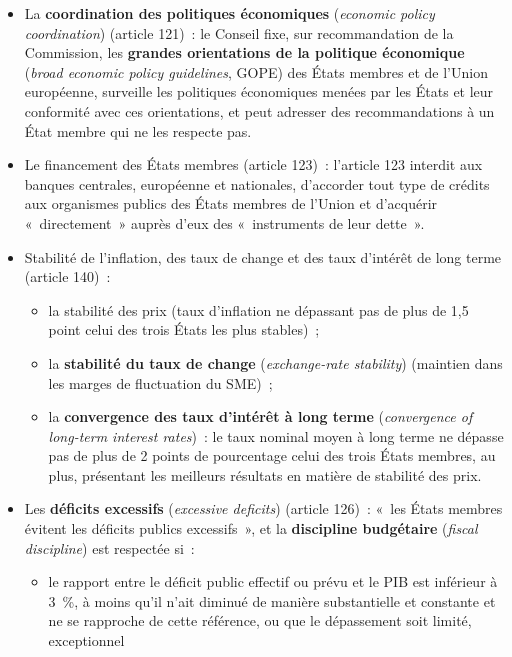 \begin{itemize}
  \item La \textbf{coordination des politiques économiques} (\textit{economic policy
    coordination}) (article 121)~: le Conseil fixe, sur recommandation de la Commission,
    les \textbf{grandes orientations de la politique économique} (\textit{broad
    economic policy guidelines}, GOPE) des États membres et de l'Union européenne, surveille
    les politiques économiques menées par les États et leur conformité avec ces
    orientations, et peut adresser des recommandations à un État membre qui ne les
    respecte pas.
  \item Le financement des États membres (article 123)~: l'article 123 interdit aux
    banques centrales, européenne et nationales, d'accorder tout type de crédits aux
    organismes publics des États membres de l'Union et d'acquérir «~directement~»
    auprès d'eux des «~instruments de leur dette~».
  \item Stabilité de l'inflation, des taux de change et des taux d'intérêt de long terme
    (article 140)~:
    \begin{itemize}
      \item la stabilité des prix (taux d'inflation ne dépassant pas de plus de 1,5
        point celui des trois États les plus stables)~;
      \item la \textbf{stabilité du taux de change} (\textit{exchange-rate stability})
        (maintien dans les marges de fluctuation du SME)~;
      \item la \textbf{convergence des taux d'intérêt à long terme}
        (\textit{convergence of long-term interest rates})~: le taux nominal moyen à
        long terme ne dépasse pas de plus de 2 points de pourcentage celui des trois
        États membres, au plus, présentant les meilleurs résultats en matière de
        stabilité des prix.
    \end{itemize}
  \item Les \textbf{déficits excessifs} (\textit{excessive deficits}) (article 126)~:
    «~les États membres évitent les déficits publics excessifs~», et la
    \textbf{discipline budgétaire} (\textit{fiscal discipline}) est respectée si~:
    \begin{itemize}
      \item le rapport entre le déficit public effectif ou prévu et le PIB est inférieur
        à 3~\%, à moins qu'il n'ait diminué de manière substantielle et constante et ne
        se rapproche de cette référence, ou que le dépassement soit limité, exceptionnel

\end{itemize}
\end{itemize}
